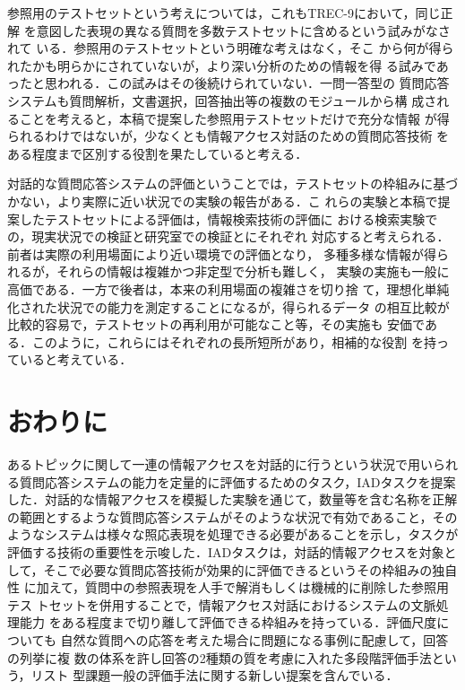 \documentclass[japanese]{jnlp_1.4}
\begin{document}
参照用のテストセットという考えについては，これもTREC-9において，同じ正解
を意図した表現の異なる質問を多数テストセットに含めるという試みがなされて
いる\cite{Voorhees04}．参照用のテストセットという明確な考えはなく，そこ
から何が得られたかも明らかにされていないが，より深い分析のための情報を得
る試みであったと思われる．この試みはその後続けられていない．一問一答型の
質問応答システムも質問解析，文書選択，回答抽出等の複数のモジュールから構
成されることを考えると，本稿で提案した参照用テストセットだけで充分な情報
が得られるわけではないが，少なくとも情報アクセス対話のための質問応答技術
をある程度まで区別する役割を果たしていると考える．

対話的な質問応答システムの評価ということでは，テストセットの枠組みに基づ
かない，より実際に近い状況での実験の報告がある\cite{Liddy04,Kelly06}．こ
れらの実験と本稿で提案したテストセットによる評価は，情報検索技術の評価に
おける検索実験での，現実状況での検証と研究室での検証\cite{Kishida98}とにそれぞれ
対応すると考えられる．前者は実際の利用場面により近い環境での評価となり，
多種多様な情報が得られるが，それらの情報は複雑かつ非定型で分析も難しく，
実験の実施も一般に高価である．一方で後者は，本来の利用場面の複雑さを切り捨
て，理想化単純化された状況での能力を測定することになるが，得られるデータ
の相互比較が比較的容易で，テストセットの再利用が可能なこと等，その実施も
安価である．このように，これらにはそれぞれの長所短所があり，相補的な役割
を持っていると考えている．



\section{おわりに} \label{Sec6}

あるトピックに関して一連の情報アクセスを対話的に行うという状況で用いられ
る質問応答システムの能力を定量的に評価するためのタスク，IADタスクを提案
した．対話的な情報アクセスを模擬した実験を通じて，数量等を含む名称を正解
の範囲とするような質問応答システムがそのような状況で有効であること，その
ようなシステムは様々な照応表現を処理できる必要があることを示し，タスクが
評価する技術の重要性を示唆した．IADタスクは，対話的情報アクセスを対象と
して，そこで必要な質問応答技術が効果的に評価できるというその枠組みの独自性
に加えて，質問中の参照表現を人手で解消もしくは機械的に削除した参照用テス
トセットを併用することで，情報アクセス対話におけるシステムの文脈処理能力
をある程度まで切り離して評価できる枠組みを持っている．評価尺度についても
自然な質問への応答を考えた場合に問題になる事例に配慮して，回答の列挙に複
数の体系を許し回答の2種類の質を考慮に入れた多段階評価手法という，リスト
型課題一般の評価手法に関する新しい提案を含んでいる．
\end{document}
